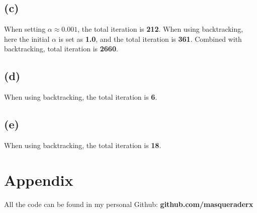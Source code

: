 \documentclass[12pt, a4 paper]{article}
\begin{document}
\begin{framed}
        \subsection{(c)}
        When setting $\alpha \approx 0.001$, the total iteration is \textbf{212}. When using
         backtracking, here the initial $\alpha$  is set as \textbf{1.0}, and the total 
         iteration is \textbf{361}. Combined with backtracking, total iteration is
         \textbf{2660}.

        \subsection{(d)}
        When using backtracking, the total iteration is \textbf{6}.
        
        \subsection{(e)}
        When using backtracking, the total iteration is \textbf{18}. 
    \end{framed}

    \section{Appendix}
    All the code can be found in my personal Github: \textbf{github.com/masqueraderx}
\end{document}
